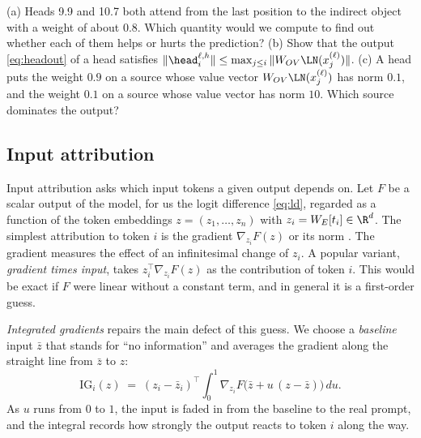 \begin{exercise}\label{ex:pattern}
(a) Heads 9.9 and 10.7 both attend from the last position to the indirect object with a weight of about $0.8$.
Which quantity would we compute to find out whether each of them helps or hurts the prediction? (b) Show that
the output \eqref{eq:headout} of a head satisfies
$\|\head_i^{\ell,h}\|\le\max_{j\le i}\|W_{OV}\LN(x_j^{(\ell)})\|$. (c) A head puts the weight $0.9$ on a source
whose value vector $W_{OV}\LN(x_j^{(\ell)})$ has norm $0.1$, and the weight $0.1$ on a source whose value vector
has norm $10$. Which source dominates the output?
\end{exercise}

\subsection{Input attribution}
\label{sec:attribution}

Input attribution asks which input tokens a given output depends on. Let $F$ be a scalar output of the model,
for us the logit difference \eqref{eq:ld}, regarded as a function of the token embeddings
$z=(z_1,\dots,z_n)$ with $z_i=W_E[t_i]\in\R^d$. The simplest attribution to token $i$ is the gradient
$\nabla_{z_i}F(z)$ or its norm \citep{simonyan2014deep}. The gradient measures the effect of an infinitesimal
change of $z_i$. A popular variant, \emph{gradient times input}, takes $z_i^\top\nabla_{z_i}F(z)$ as the
contribution of token $i$. This would be exact if $F$ were linear without a constant term, and in general it
is a first-order guess.

\emph{Integrated gradients} \citep{sundararajan2017axiomatic} repairs the main defect of this guess. We choose
a \emph{baseline} input $\bar z$ that stands for ``no information'' and averages the gradient along the straight
line from $\bar z$ to $z$:
\begin{equation}\label{eq:ig}
\mathrm{IG}_i(z) \;=\; (z_i-\bar z_i)^\top\int_0^1\nabla_{z_i}F\big(\bar z+u\,(z-\bar z)\big)\,du .
\end{equation}
As $u$ runs from $0$ to $1$, the input is faded in from the baseline to the real prompt, and the integral records
how strongly the output reacts to token $i$ along the way.


